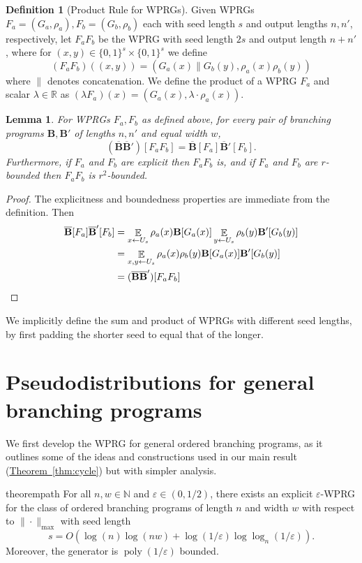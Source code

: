 \documentclass[11pt]{article}
\numberwithin{equation}{section}
\newtheorem{lemma}[theorem]{Lemma}
\theoremstyle{definition}
\newtheorem{definition}[theorem]{Definition}
\theoremstyle{plain}
\newcommand{\R}{\mathbb R}
\newcommand{\N}{\mathbb N}
\newcommand{\expref}[2]{\hyperref[#2]{#1~\ref{#2}}}
\newcommand{\eps}{\varepsilon}
\newcommand{\zo}{\{0,1\}}
\newcommand{\la}{\leftarrow}
\DeclareMathOperator*{\E}{\mathbb{E}}
\newcommand{\poly}{\operatorname{poly}}
\newcommand{\bp}{{\mathbf{B}}}
\newcommand{\bbp}{\overline{\mathbf{B}}}
\begin{document}
\begin{definition}[Product Rule for WPRGs]\label{def:prodrule}
Given WPRGs $F_a=(G_a,\rho_a),F_b=(G_b,\rho_b)$ each with seed length $s$ and output lengths $n,n'$, respectively, %
let $F_aF_b$ be the WPRG with seed length $2s$ and output length $n+n'$, where for $(x,y)\in \zo^s\times\zo^s$ we define
\[(F_a F_b)((x,y)) = (G_a(x)\|G_b(y),\rho_a(x)\rho_b(y))\]
where $\|$ denotes concatenation. We define the product of a WPRG $F_a$ and scalar $\lambda \in \R$ as $(\lambda F_a)(x)=(G_a(x),\lambda\cdot\rho_a(x))$.
\end{definition}
\begin{lemma}
For WPRGs $F_a,F_b$ as defined above, for every pair of branching programs $\bp,\bp'$ of lengths $n,n'$ and equal width $w$,
$$(\bbp\bbp')[F_aF_b]=\bbp[F_a]\bbp'[F_b].$$
Furthermore, if $F_a$ and $F_b$ are explicit then $F_aF_b$ is, and if $F_a$ and $F_b$ are $r$-bounded then $F_aF_b$ is $r^2$-bounded.
\end{lemma}
\begin{proof}
The explicitness and boundedness properties are immediate from the definition. 
Then %
\begin{align*}
\bbp[F_a]\bbp'[F_b] &= \E_{x\la U_s}\rho_a(x)\bp[G_a(x)]\E_{y\la U_s}\rho_b(y)\bp'[G_b(y)]\\
&= \E_{x,y\la U_s}\rho_a(x)\rho_b(y)\bp[G_a(x)]\bp'[G_b(y)]\\
&= (\bbp\bbp')[F_aF_b] \qedhere
\end{align*}
\end{proof}
We implicitly define the sum and product of WPRGs with different seed lengths, by first padding the shorter seed to equal that of the longer.
    
\section{Pseudodistributions for general branching programs}\label{sec:path}
    We first develop the WPRG for general ordered branching programs, as it outlines some of the ideas and constructions used in our main result (\expref{Theorem}{thm:cycle}) but with simpler analysis.
    \begin{restatable}{theorem}{path}\label{thm:path}
        For all $n,w \in \N$ and $\eps \in (0,1/2)$, there exists an explicit $\eps$-WPRG for the class of ordered branching programs of length $n$ and width $w$ with respect to $\|\cdot\|_{\max}$ with seed length
        \[s=O(\log(n)\log(nw)+\log(1/\eps)\log\log_{n}(1/\eps)).\]
        Moreover, the generator is $\poly(1/\eps)$ bounded.
    \end{restatable}
\end{document}
